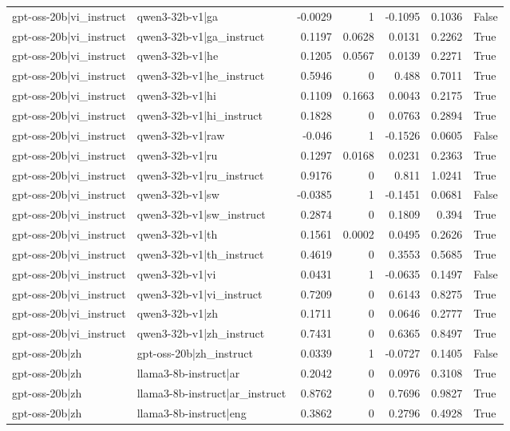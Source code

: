 \begin{table}
\begin{tabular}{l l r r r r l}
gpt-oss-20b|vi_instruct & qwen3-32b-v1|ga & -0.0029 & 1 & -0.1095 & 0.1036 & False \\
gpt-oss-20b|vi_instruct & qwen3-32b-v1|ga_instruct & 0.1197 & 0.0628 & 0.0131 & 0.2262 & True \\
gpt-oss-20b|vi_instruct & qwen3-32b-v1|he & 0.1205 & 0.0567 & 0.0139 & 0.2271 & True \\
gpt-oss-20b|vi_instruct & qwen3-32b-v1|he_instruct & 0.5946 & 0 & 0.488 & 0.7011 & True \\
gpt-oss-20b|vi_instruct & qwen3-32b-v1|hi & 0.1109 & 0.1663 & 0.0043 & 0.2175 & True \\
gpt-oss-20b|vi_instruct & qwen3-32b-v1|hi_instruct & 0.1828 & 0 & 0.0763 & 0.2894 & True \\
gpt-oss-20b|vi_instruct & qwen3-32b-v1|raw & -0.046 & 1 & -0.1526 & 0.0605 & False \\
gpt-oss-20b|vi_instruct & qwen3-32b-v1|ru & 0.1297 & 0.0168 & 0.0231 & 0.2363 & True \\
gpt-oss-20b|vi_instruct & qwen3-32b-v1|ru_instruct & 0.9176 & 0 & 0.811 & 1.0241 & True \\
gpt-oss-20b|vi_instruct & qwen3-32b-v1|sw & -0.0385 & 1 & -0.1451 & 0.0681 & False \\
gpt-oss-20b|vi_instruct & qwen3-32b-v1|sw_instruct & 0.2874 & 0 & 0.1809 & 0.394 & True \\
gpt-oss-20b|vi_instruct & qwen3-32b-v1|th & 0.1561 & 0.0002 & 0.0495 & 0.2626 & True \\
gpt-oss-20b|vi_instruct & qwen3-32b-v1|th_instruct & 0.4619 & 0 & 0.3553 & 0.5685 & True \\
gpt-oss-20b|vi_instruct & qwen3-32b-v1|vi & 0.0431 & 1 & -0.0635 & 0.1497 & False \\
gpt-oss-20b|vi_instruct & qwen3-32b-v1|vi_instruct & 0.7209 & 0 & 0.6143 & 0.8275 & True \\
gpt-oss-20b|vi_instruct & qwen3-32b-v1|zh & 0.1711 & 0 & 0.0646 & 0.2777 & True \\
gpt-oss-20b|vi_instruct & qwen3-32b-v1|zh_instruct & 0.7431 & 0 & 0.6365 & 0.8497 & True \\
gpt-oss-20b|zh & gpt-oss-20b|zh_instruct & 0.0339 & 1 & -0.0727 & 0.1405 & False \\
gpt-oss-20b|zh & llama3-8b-instruct|ar & 0.2042 & 0 & 0.0976 & 0.3108 & True \\
gpt-oss-20b|zh & llama3-8b-instruct|ar_instruct & 0.8762 & 0 & 0.7696 & 0.9827 & True \\
gpt-oss-20b|zh & llama3-8b-instruct|eng & 0.3862 & 0 & 0.2796 & 0.4928 & True \\

\end{tabular}
\end{table}

